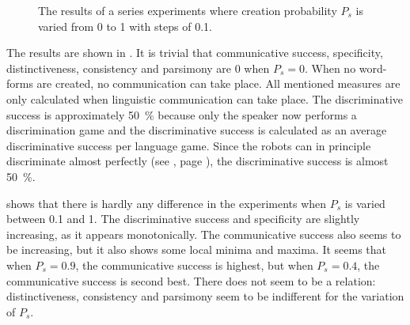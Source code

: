 \begin{figure}
\caption{The results of a series experiments where creation probability $P_s$ is varied from 0 to 1 with steps of 0.1.}
\label{f:lex:p}
\end{figure}

The results are shown in . It is trivial that communicative success, specificity, distinctiveness, consistency and parsimony are 0 when $P_s=0$. When no word-forms are created, no communication can take place. All mentioned measures are only calculated when linguistic communication can take place. The discriminative success is approximately 50~\% because only the speaker now performs a discrimination game and the discriminative success is calculated as an average discriminative success per language game. Since the robots can in principle discriminate almost perfectly (see , page \pageref{f:st:ds}), the discriminative success is almost 50~\%. 

 shows that there is hardly any difference in the experiments when $P_s$ is varied between 0.1 and 1. The discriminative success and specificity are slightly increasing, as it appears monotonically. The communicative success also seems to be increasing, but it also shows some local minima and maxima. It seems that when $P_s=0.9$, the communicative success is highest, but when $P_s=0.4$, the communicative success is second best. There does not seem to be a relation: distinctiveness, consistency and parsimony seem to be indifferent for the variation of $P_s$.

